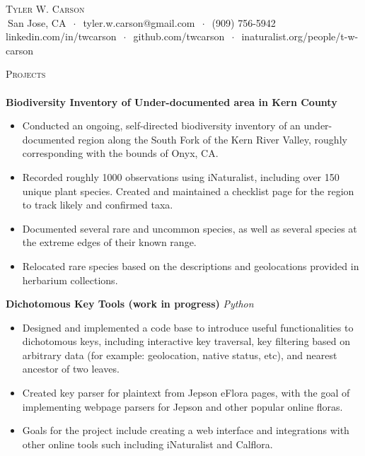 \documentclass[]{article}
\newcommand{\lineunder} {
	\vspace*{-8pt} \\
	\hspace*{-18pt} \hrulefill \\
}
\newcommand{\header} [1] {
	{\hspace*{-18pt}\vspace*{6pt} \textsc{#1}}
	\vspace*{-6pt} \lineunder
}
\begin{document}
	\vspace*{-40pt}
	
	
	\vspace*{-10pt}
	\begin{center}
		{\Huge \scshape {Tyler W. Carson}}\\
		$\ $San Jose, CA $\ \cdot\ $ tyler.w.carson@gmail.com $\ \cdot\ $ (909) 756-5942\\ linkedin.com/in/twcarson $\ \cdot\ $ github.com/twcarson $\ \cdot\ $ inaturalist.org/people/t-w-carson\\
	\end{center}
	

	\header{Projects}

	{\textbf{Biodiversity Inventory of Under-documented area in Kern County}} \hspace*{5mm} \\
	\vspace*{-5pt}\begin{itemize}	\itemsep 0pt
		\item Conducted an ongoing, self-directed biodiversity inventory of an under-documented region along the South Fork of the Kern River Valley, roughly corresponding with the bounds of Onyx, CA.
		\item Recorded roughly 1000 observations using iNaturalist, including over 150 unique plant species.  Created and maintained a checklist page for the region to track likely and confirmed taxa.
		\item Documented several rare and uncommon species, as well as several species at the extreme edges of their known range.
		\item Relocated rare species based on the descriptions and geolocations provided in herbarium collections.
	\end{itemize}
	\vspace*{0mm}
	
	{\textbf{Dichotomous Key Tools (work in progress)}} \hfill {\sl Python} \\
	\vspace*{-5pt}\begin{itemize}	\itemsep 0pt
		\item Designed and implemented a code base to introduce useful functionalities to dichotomous keys, including interactive key traversal, key filtering based on arbitrary data (for example: geolocation, native status, etc), and nearest ancestor of two leaves. 
		\item Created key parser for plaintext from Jepson eFlora pages, with the goal of implementing webpage parsers for Jepson and other popular online floras.
		\item Goals for the project include creating a web interface and integrations with other online tools such including iNaturalist and Calflora.
	\end{itemize}
	\vspace*{0mm}
	
\end{document}
